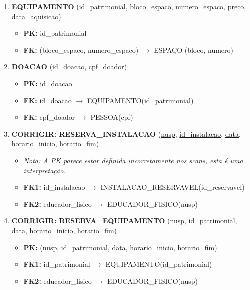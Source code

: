 \documentclass{article}
\begin{document}
\begin{enumerate}
    \item \textbf{EQUIPAMENTO} (\underline{id\_patrimonial}, bloco\_espaco, numero\_espaco, preco, data\_aquisicao)
        \begin{itemize}
            \item \textbf{PK:} id\_patrimonial
            \item \textbf{FK:} (bloco\_espaco, numero\_espaco) $\rightarrow$ ESPAÇO (bloco, numero)
        \end{itemize}
        
    \item \textbf{DOACAO} (\underline{id\_doacao}, cpf\_doador)
        \begin{itemize}
            \item \textbf{PK:} id\_doacao
            \item \textbf{FK:} id\_doacao $\rightarrow$ EQUIPAMENTO(id\_patrimonial)
            \item \textbf{FK:} cpf\_doador $\rightarrow$ PESSOA(cpf)
        \end{itemize}

    \item \textbf{CORRIGIR: RESERVA\_INSTALACAO} (\underline{nusp}, \underline{id\_instalacao}, \underline{data}, \underline{horario\_inicio}, \underline{horario\_fim})
         \begin{itemize}
            \item \textit{Nota: A PK parece estar definida incorretamente nos scans, esta é uma interpretação.}
            \item \textbf{FK1:} id\_instalacao $\rightarrow$ INSTALACAO\_RESERVAVEL(id\_reservavel)
            \item \textbf{FK2:} educador\_fisico $\rightarrow$ EDUCADOR\_FISICO(nusp)
        \end{itemize}
        
    \item \textbf{CORRIGIR: RESERVA\_EQUIPAMENTO} (\underline{nusp}, \underline{id\_patrimonial}, \underline{data}, \underline{horario\_inicio}, \underline{horario\_fim})
        \begin{itemize}
            \item \textbf{PK:} (nusp, id\_patrimonial, data, horario\_inicio, horario\_fim)
            \item \textbf{FK1:} id\_patrimonial $\rightarrow$ EQUIPAMENTO(id\_patrimonial)
            \item \textbf{FK2:} educador\_fisico $\rightarrow$ EDUCADOR\_FISICO(nusp)
        \end{itemize}


\end{enumerate}
\end{document}
